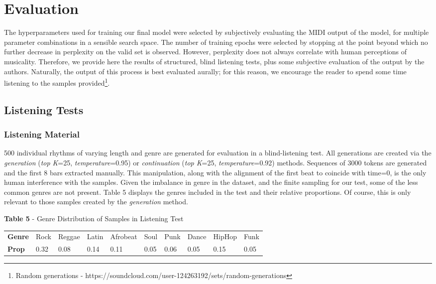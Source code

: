 \documentclass[sigconf]{nimeart}
\begin{document}
\section{Evaluation}\label{evaluation}

The hyperparameters used for training our final model were selected by subjectively evaluating the MIDI output of the model, for multiple parameter combinations in a sensible search space. The number of training epochs were selected by stopping at the point beyond which no further decrease in perplexity on the valid set is observed. However, perplexity does not always correlate with human perceptions of musicality. Therefore, we provide here the results of structured, blind listening tests, plus some subjective evaluation of the output by the authors. Naturally, the output of this process is best evaluated aurally; for this reason, we encourage the reader to spend some time listening to the samples provided\footnote{Random generations - https://soundcloud.com/user-124263192/sets/random-generations}.

\subsection{Listening Tests}\label{listening-tests}

\subsubsection{Listening Material}\label{listening-material}

500 individual rhythms of varying length and genre are generated for evaluation in a blind-listening test. All generations are created via the \emph{generation} (\emph{top K}=25, \emph{temperature}=0.95) or \emph{continuation} (\emph{top K}=25, \emph{temperature}=0.92) methods. Sequences of 3000 tokens are generated and the first 8 bars extracted manually. This manipulation, along with the alignment of the first beat to coincide with time=0, is the only human interference with the samples. Given the imbalance in genre in the dataset, and the finite sampling for our test, some of the less common genres are not present. Table 5 displays the genres included in the test and their relative proportions. Of course, this is only relevant to those samples created by the \emph{generation} method.

\textbf{Table 5} - Genre Distribution of Samples in Listening Test

{\def\LTcaptype{none} %
\begin{table}[htbp]\centering\small
\begin{adjustbox}{max width=\textwidth}\begin{tabular}{llllllllll}
\toprule\noalign{}
\midrule
\textbf{Genre} & Rock & Reggae & Latin & Afrobeat & Soul & Punk & Dance & HipHop & Funk \\
\textbf{Prop} & 0.32 & 0.08 & 0.14 & 0.11 & 0.05 & 0.06 & 0.05 & 0.15 & 0.05 \\
\bottomrule
\end{tabular}\end{adjustbox}\end{table}
}
\end{document}
